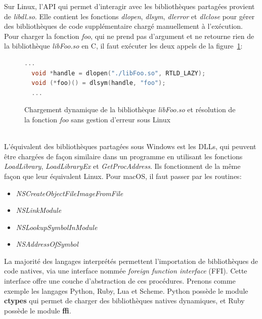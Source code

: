 Sur Linux, l'API qui permet d'interagir avec les bibliothèques partagées provient de \textit{libdl.so}.
Elle contient les fonctions \textit{dlopen}, \textit{dlsym}, \textit{dlerror} et \textit{dlclose} pour gérer
des bibliothèques de code supplémentaire chargé manuellement à l'exécution.  Pour charger la fonction
\textit{foo}, qui ne prend pas d'argument et ne retourne rien de la bibliothèque \textit{libFoo.so} en C,
il faut exécuter les deux appels de la figure~\ref{fig:dlsym_dlopen}:
  \begin{figure}[ht]
    \centering
\begin{lstlisting}[language=C,frame=single]
  ...
  void *handle = dlopen("./libFoo.so", RTLD_LAZY);
  void (*foo)() = dlsym(handle, "foo");
  ...
\end{lstlisting}
  \caption{Chargement dynamique de la bibliothèque \textit{libFoo.so} et
    résolution de la fonction \textit{foo} sans gestion d'erreur sous Linux}
    \label{fig:dlsym_dlopen}
\end{figure}\\
L'équivalent des bibliothèques partagées sous Windows est les DLLs, qui peuvent
être chargées de façon similaire dans un programme en utilisant les fonctions
\textit{LoadLibrary}, \textit{LoadLibraryEx} et \textit{GetProcAddress}. Ils
fonctionnent de la même façon que leur équivalent Linux. Pour macOS, il faut
passer par les routines:
\begin{itemize}
    \item \textit{NSCreateObjectFileImageFromFile}
    \item \textit{NSLinkModule}
    \item \textit{NSLookupSymbolInModule}
    \item \textit{NSAddressOfSymbol}
\end{itemize}

La majorité des langages interprétés permettent l'importation de bibliothèques
de code natives, via une interface nommée \textit{foreign function interface}
(FFI).  Cette interface offre une couche d'abstraction de ces procédures.
Prenons comme exemple les langages Python, Ruby, Lua et Scheme. Python possède
le module \textbf{ctypes} qui permet de charger des bibliothèques natives
dynamiques, et Ruby possède le module \textbf{ffi}.


